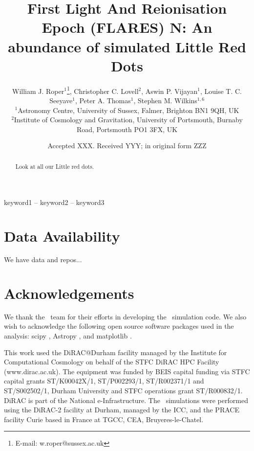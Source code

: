 \documentclass[fleqn,usenatbib]{mnras}
\title[FLARES N]{First Light And Reionisation Epoch (FLARES) N: An abundance of simulated Little Red Dots}
\author[William J. Roper et al.]{William J. Roper$^{1}$\thanks{E-mail: w.roper@sussex.ac.uk}, %
Christopher C. Lovell$^{2}$, %
Aswin P. Vijayan$^{1}$, %
Louise T. C. Seeyave$^{1}$, %
\newauthor
Peter A. Thomas$^{1}$, %
Stephen M. Wilkins$^{1,6}$ %
\\
$^{1}$Astronomy Centre, University of Sussex, Falmer, Brighton BN1 9QH, UK\\
$^{2}$Institute of Cosmology and Gravitation, University of Portsmouth, Burnaby Road, Portsmouth PO1 3FX, UK}
\date{Accepted XXX. Received YYY; in original form ZZZ}
\newcommand{\eagle}{\mbox{\sc{Eagle}}}
\begin{document}
\label{firstpage}
\pagerange{\pageref{firstpage}--\pageref{lastpage}}
\maketitle

\begin{abstract}
Look at all our Little red dots.
\end{abstract}

\begin{keywords}
keyword1 -- keyword2 -- keyword3
\end{keywords}













\section*{Data Availability}

We have data and repos...

\section*{Acknowledgements}

We thank the \eagle\ team for their efforts in developing the \eagle\ simulation code.
We also wish to acknowledge the following open source software packages used in the analysis: \textsf{scipy} \citep{2020SciPy-NMeth}, \textsf{Astropy} \citep{robitaille_astropy:_2013}, and \textsf{matplotlib} \citep{Hunter:2007}.

This work used the DiRAC@Durham facility managed by the Institute for Computational Cosmology on behalf of the STFC DiRAC HPC Facility (www.dirac.ac.uk).
The equipment was funded by BEIS capital funding via STFC capital grants ST/K00042X/1, ST/P002293/1, ST/R002371/1 and ST/S002502/1, Durham University and STFC operations grant ST/R000832/1.
DiRAC is part of the National e-Infrastructure. The \eagle\ simulations were performed using the DiRAC-2 facility at Durham, managed by the ICC, and the PRACE facility Curie based in France at TGCC, CEA, Bruyeres-le-Chatel.
\end{document}
